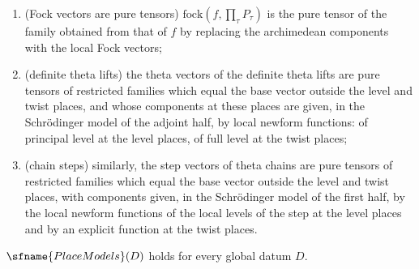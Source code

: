 \begin{definition}
\begin{enumerate}[label=(P\arabic*),leftmargin=*]
subgroups act by determinant characters composed with a linear substitution of the variables, and the non-compact part of the Lie
algebras acts by second order operators (creation and annihilation pairs);
\item\label{pf:sh-theta:P10} (Fock vectors are pure tensors) $\mathrm{fock}(f,\prod_\tau P_\tau)$ is the pure tensor of the family
obtained from that of $f$ by replacing the archimedean components with the local Fock vectors;
\item\label{pf:sh-theta:P11} (definite theta lifts) the theta vectors of the definite theta lifts are pure tensors of restricted
families which equal the base vector outside the level and twist places, and whose components at these places are given, in the
Schr\"odinger model of the adjoint half, by local newform functions: of principal level at the level places, of full level at
the twist places;
\item\label{pf:sh-theta:P12} (chain steps) similarly, the step vectors of theta chains are pure tensors of restricted families
which equal the base vector outside the level and twist places, with components given, in the Schr\"odinger model of the first
half, by the local newform functions of the local levels of the step at the level places and by an explicit function at the twist
places.
\end{enumerate}
\end{definition}

\begin{theorem}\label{pf:sh-theta:placemodels}
$\sfname{PlaceModels}(D)$ holds for every global datum $D$.
\end{theorem}

